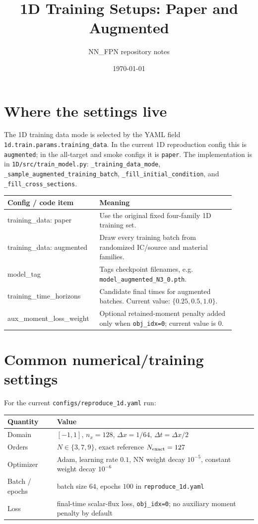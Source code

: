 \documentclass[10pt]{article}
\title{1D Training Setups: Paper and Augmented}
\author{NN\_FPN repository notes}
\date{\today}
\begin{document}
\maketitle

\section*{Where the settings live}
The 1D training data mode is selected by the YAML field
\texttt{1d.train.params.training\_data}. In the current 1D reproduction config this is
\texttt{augmented}; in the all-target and smoke configs it is \texttt{paper}.
The implementation is in \texttt{1D/src/train\_model.py}: \texttt{\_training\_data\_mode},
\texttt{\_sample\_augmented\_training\_batch}, \texttt{\_fill\_initial\_condition}, and
\texttt{\_fill\_cross\_sections}.

\begin{center}
\begin{tabular}{>{\ttfamily}p{0.33\linewidth} p{0.58\linewidth}}
\toprule
Config / code item & Meaning \\
\midrule
training\_data: paper & Use the original fixed four-family 1D training set. \\
training\_data: augmented & Draw every training batch from randomized IC/source and material families. \\
model\_tag & Tags checkpoint filenames, e.g. \texttt{model\_augmented\_N3\_0.pth}. \\
training\_time\_horizons & Candidate final times for augmented batches. Current value: \(\{0.25,0.5,1.0\}\). \\
aux\_moment\_loss\_weight & Optional retained-moment penalty added only when \texttt{obj\_idx=0}; current value is \(0\). \\
\bottomrule
\end{tabular}
\end{center}

\section*{Common numerical/training settings}
For the current \texttt{configs/reproduce\_1d.yaml} run:
\begin{center}
\begin{tabular}{ll}
\toprule
Quantity & Value \\
\midrule
Domain & \([-1,1]\), \(n_x=128\), \(\Delta x = 1/64\), \(\Delta t = \Delta x/2\) \\
Orders & \(N\in\{3,7,9\}\), exact reference \(N_{\rm exact}=127\) \\
Optimizer & Adam, learning rate \(0.1\), NN weight decay \(10^{-5}\), constant weight decay \(10^{-6}\) \\
Batch / epochs & batch size \(64\), epochs \(100\) in \texttt{reproduce\_1d.yaml} \\
Loss & final-time scalar-flux loss, \texttt{obj\_idx=0}; no auxiliary moment penalty by default \\
\bottomrule
\end{tabular}
\end{center}
\end{document}
